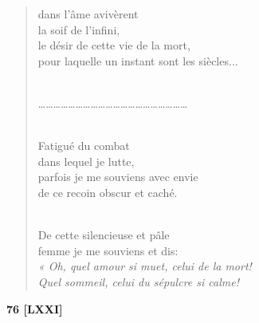 \documentclass[a4paper,12pt]{book}
\begin{document}
\begin{verse}
dans l'âme avivèrent \\
la soif de l'infini, \\
le désir de cette vie de la mort, \\
pour laquelle un instant sont les siècles... \\ \

\ldots\ldots\ldots\ldots\ldots\ldots\ldots\ldots\ldots\ldots\ldots\ldots\ldots\ldots\ldots\ldots\ldots\ldots\ldots\ldots \\ \

Fatigué du combat \\
dans lequel je lutte, \\
parfois je me souviens avec envie \\
de ce recoin obscur et caché. \\ \

De cette silencieuse et pâle \\
femme je me souviens et dis: \\
{\em « Oh, quel amour si muet, celui de la mort! \\
Quel sommeil, celui du sépulcre si calme!} \\
\end{verse}

\bigskip

\begin{center} {\bf 76 [LXXI]}  \end{center}
\end{document}
